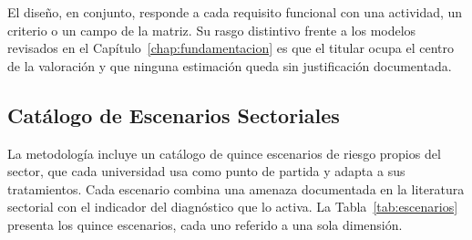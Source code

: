 El diseño, en conjunto, responde a cada requisito funcional con una actividad, un criterio o un campo de la matriz. Su rasgo distintivo frente a los modelos revisados en el Capítulo~\ref{chap:fundamentacion} es que el titular ocupa el centro de la valoración y que ninguna estimación queda sin justificación documentada.


\subsection{Catálogo de Escenarios Sectoriales}
\label{sec:escenarios_sectoriales}

La metodología incluye un catálogo de quince escenarios de riesgo propios del sector, que cada universidad usa como punto de partida y adapta a sus tratamientos. Cada escenario combina una amenaza documentada en la literatura sectorial \cite{ulven2021systematic,alvarez2024proteccion,li2023breach,mora2024lms} con el indicador del diagnóstico que lo activa. La Tabla~\ref{tab:escenarios} presenta los quince escenarios, cada uno referido a una sola dimensión.

